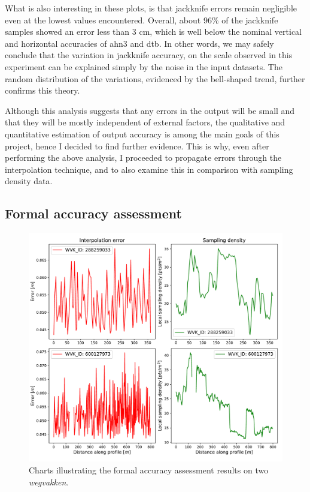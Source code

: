 What is also interesting in these plots, is that jackknife errors remain negligible even at the lowest values encountered. Overall, about 96\% of the jackknife samples showed an error less than 3 cm, which is well below the nominal vertical and horizontal accuracies of \ac{ahn3} and \ac{dtb}. In other words, we may safely conclude that the variation in jackknife accuracy, on the scale observed in this experiment can be explained simply by the noise in the input datasets. The random distribution of the variations, evidenced by the bell-shaped trend, further confirms this theory.

Although this analysis suggests that any errors in the output will be small and that they will be mostly independent of external factors, the qualitative and quantitative estimation of output accuracy is among the main goals of this project, hence I decided to find further evidence. This is why, even after performing the above analysis, I proceeded to propagate errors through the interpolation technique, and to also examine this in comparison with sampling density data.

\subsection{Formal accuracy assessment}
\label{sub:accuracyformal}

\begin{figure}
    \centering
    \includegraphics[width=0.9\linewidth]{final_report/figs/formalaccuracy0.pdf}
    \caption{Charts illustrating the formal accuracy assessment results on two \textit{wegvakken}.}
    \label{fig:formalaccuracy0}
\end{figure}

